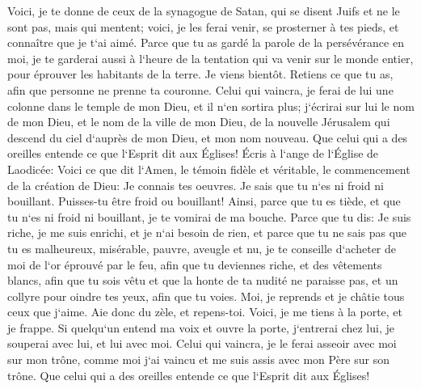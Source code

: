 \verse Voici, je te donne de ceux de la synagogue de Satan, qui se disent Juifs et ne le sont pas, mais qui mentent; voici, je les ferai venir, se prosterner à tes pieds, et connaître que je t`ai aimé. 
\verse Parce que tu as gardé la parole de la persévérance en moi, je te garderai aussi à l`heure de la tentation qui va venir sur le monde entier, pour éprouver les habitants de la terre. 
\verse Je viens bientôt. Retiens ce que tu as, afin que personne ne prenne ta couronne. 
\verse Celui qui vaincra, je ferai de lui une colonne dans le temple de mon Dieu, et il n`en sortira plus; j`écrirai sur lui le nom de mon Dieu, et le nom de la ville de mon Dieu, de la nouvelle Jérusalem qui descend du ciel d`auprès de mon Dieu, et mon nom nouveau. 
\verse Que celui qui a des oreilles entende ce que l`Esprit dit aux Églises! 
\verse Écris à l`ange de l`Église de Laodicée: Voici ce que dit l`Amen, le témoin fidèle et véritable, le commencement de la création de Dieu: 
\verse Je connais tes oeuvres. Je sais que tu n`es ni froid ni bouillant. Puisses-tu être froid ou bouillant! 
\verse Ainsi, parce que tu es tiède, et que tu n`es ni froid ni bouillant, je te vomirai de ma bouche. 
\verse Parce que tu dis: Je suis riche, je me suis enrichi, et je n`ai besoin de rien, et parce que tu ne sais pas que tu es malheureux, misérable, pauvre, aveugle et nu, 
\verse je te conseille d`acheter de moi de l`or éprouvé par le feu, afin que tu deviennes riche, et des vêtements blancs, afin que tu sois vêtu et que la honte de ta nudité ne paraisse pas, et un collyre pour oindre tes yeux, afin que tu voies. 
\verse Moi, je reprends et je châtie tous ceux que j`aime. Aie donc du zèle, et repens-toi. 
\verse Voici, je me tiens à la porte, et je frappe. Si quelqu`un entend ma voix et ouvre la porte, j`entrerai chez lui, je souperai avec lui, et lui avec moi. 
\verse Celui qui vaincra, je le ferai asseoir avec moi sur mon trône, comme moi j`ai vaincu et me suis assis avec mon Père sur son trône. 
\verse Que celui qui a des oreilles entende ce que l`Esprit dit aux Églises! 

